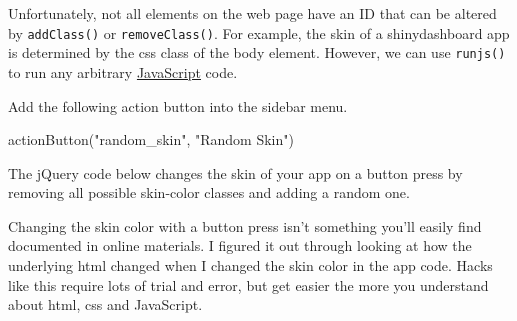 \documentclass[
]{book}
\newenvironment{Shaded}{\begin{snugshade}}{\end{snugshade}}
\newcommand{\AttributeTok}[1]{\textcolor[rgb]{0.77,0.63,0.00}{#1}}
\newcommand{\DecValTok}[1]{\textcolor[rgb]{0.00,0.00,0.81}{#1}}
\newcommand{\FunctionTok}[1]{\textcolor[rgb]{0.00,0.00,0.00}{#1}}
\newcommand{\NormalTok}[1]{#1}
\newcommand{\OtherTok}[1]{\textcolor[rgb]{0.56,0.35,0.01}{#1}}
\newcommand{\SpecialCharTok}[1]{\textcolor[rgb]{0.00,0.00,0.00}{#1}}
\newcommand{\StringTok}[1]{\textcolor[rgb]{0.31,0.60,0.02}{#1}}
\begin{document}
Unfortunately, not all elements on the web page have an ID that can be altered by \texttt{addClass()} or \texttt{removeClass()}. For example, the skin of a shinydashboard app is determined by the css class of the body element. However, we can use \texttt{runjs()} to run any arbitrary \protect\hyperlink{JavaScript}{JavaScript} code.

Add the following action button into the sidebar menu.

\begin{Shaded}
\begin{Highlighting}[]
\FunctionTok{actionButton}\NormalTok{(}\StringTok{"random\_skin"}\NormalTok{, }\StringTok{"Random Skin"}\NormalTok{)}
\end{Highlighting}
\end{Shaded}

The jQuery code below changes the skin of your app on a button press by removing all possible skin-color classes and adding a random one.

\begin{Shaded}
\end{Shaded}

Changing the skin color with a button press isn't something you'll easily find documented in online materials. I figured it out through looking at how the underlying html changed when I changed the skin color in the app code. Hacks like this require lots of trial and error, but get easier the more you understand about html, css and JavaScript.
\end{document}
